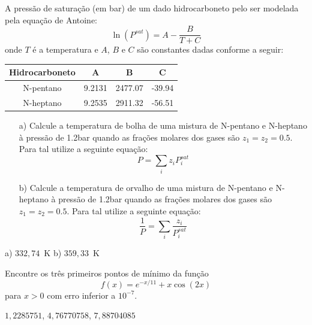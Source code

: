 \begin{Exercise}[title= Termodinâmica] A pressão de saturação (em bar) de um dado hidrocarboneto pelo ser modelada pela equação de Antoine:
$$\ln\left(P^{sat}\right)=A-\frac{B}{T+C}$$
onde $T$ é a temperatura e $A$, $B$ e $C$ são constantes dadas conforme a seguir:

\begin{tabular}{|c|c|c|c|}
\hline
Hidrocarboneto&A&B&C\\
\hline
N-pentano & 9.2131 & 2477.07 & -39.94 \\
\hline
N-heptano & 9.2535 &2911.32 &-56.51 \\
\hline
\end{tabular}
\begin{itemize}
\item[a)] Calcule a temperatura de bolha de uma mistura de N-pentano e N-heptano à pressão de 1.2bar quando as frações molares  dos gases são  $z_1=z_2=0.5$. Para tal utilize a seguinte equação:
$$P=\sum_i z_i P_i^{sat}$$
\item[b)] Calcule a temperatura de orvalho de uma mistura de N-pentano e N-heptano à pressão de 1.2bar quando as frações molares  dos gases são  $z_1=z_2=0.5$. Para tal utilize a seguinte equação:
$$\frac{1}{P}=\sum_i \frac{z_i}{P_i^{sat}}$$
\end{itemize}
\end{Exercise}

\begin{Answer}
  \begin{tiny}
 a) $332,74$~K b) $359,33$~K    
  \end{tiny}
\end{Answer}

\begin{Exercise} Encontre os três primeiros pontos de mínimo da função $$f(x)=e^{-x/11}+x\cos(2x)$$ para $x>0$ com erro inferior a $10^{-7}$.
\end{Exercise}
\begin{Answer}
  \begin{tiny}
$1,2285751$, $4,76770758$, $7,88704085$
  \end{tiny}
\end{Answer}


% 
